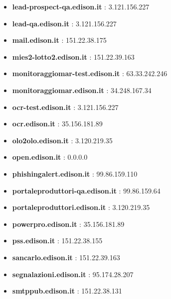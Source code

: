 \documentclass{article}
\begin{document}
\begin{itemize}
        \item \textbf{ lead-prospect-qa.edison.it }: 3.121.156.227
    
        \item \textbf{ lead-qa.edison.it }: 3.121.156.227
    
        \item \textbf{ mail.edison.it }: 151.22.38.175
    
        \item \textbf{ mies2-lotto2.edison.it }: 151.22.39.163
    
        \item \textbf{ monitoraggiomar-test.edison.it }: 63.33.242.246
    
        \item \textbf{ monitoraggiomar.edison.it }: 34.248.167.34
    
        \item \textbf{ ocr-test.edison.it }: 3.121.156.227
    
        \item \textbf{ ocr.edison.it }: 35.156.181.89
    
        \item \textbf{ olo2olo.edison.it }: 3.120.219.35
    
        \item \textbf{ open.edison.it }: 0.0.0.0
    
        \item \textbf{ phishingalert.edison.it }: 99.86.159.110
    
        \item \textbf{ portaleproduttori-qa.edison.it }: 99.86.159.64
    
        \item \textbf{ portaleproduttori.edison.it }: 3.120.219.35
    
        \item \textbf{ powerpro.edison.it }: 35.156.181.89
    
        \item \textbf{ pss.edison.it }: 151.22.38.155
    
        \item \textbf{ sancarlo.edison.it }: 151.22.39.163
    
        \item \textbf{ segnalazioni.edison.it }: 95.174.28.207
    
        \item \textbf{ smtppub.edison.it }: 151.22.38.131
    

\end{itemize}
\end{document}

